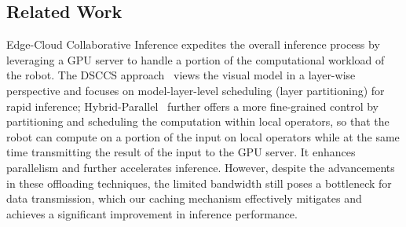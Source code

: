 \subsection{Related Work}
Edge-Cloud Collaborative Inference expedites the overall inference process by leveraging a GPU server to handle a portion of the computational workload of the robot. 
The DSCCS approach~\cite{liang2023dnn} views the visual model in a layer-wise perspective and focuses on model-layer-level scheduling (layer partitioning) for rapid inference;
Hybrid-Parallel~\cite{sun2024hybridparallel} further offers a more fine-grained control by partitioning and scheduling the computation within local operators, so that the robot can compute on a portion of the input on local operators while at the same time transmitting the result of the input to the GPU server.
It enhances parallelism and further accelerates inference. 
However, despite the advancements in these offloading techniques, the limited bandwidth still poses a bottleneck for data transmission, which our caching mechanism effectively mitigates and achieves a significant improvement in inference performance.

